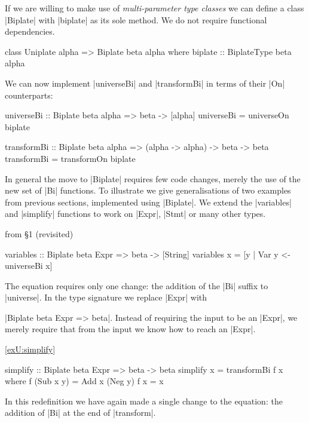 If we are willing to make use of \textit{multi-parameter type classes} \cite{jones:mptc} we can define a class |Biplate| with |biplate| as its sole method. We do not require functional dependencies.

\begin{code}
class  Uniplate alpha => Biplate beta alpha where
       biplate :: BiplateType beta alpha
\end{code}

We can now implement |universeBi| and |transformBi| in terms of their |On| counterparts:

\begin{code}
universeBi :: Biplate beta alpha => beta -> [alpha]
universeBi = universeOn biplate

transformBi :: Biplate beta alpha => (alpha -> alpha) -> beta -> beta
transformBi = transformOn biplate
\end{code}

In general the move to |Biplate| requires few code changes, merely the use of the new set of |Bi| functions. To illustrate we give generalisations of two examples from previous sections, implemented using |Biplate|. We extend the |variables| and |simplify| functions to work on |Expr|, |Stmt| or many other types.

\begin{exampleany}{from \S1 (revisited)}
\begin{code}
variables :: Biplate beta Expr => beta -> [String]
variables x = [y | Var y <- universeBi x]
\end{code}

The equation requires only one change: the addition of the |Bi| suffix to |universe|. In the type signature we replace |Expr| with \ignore|Biplate beta Expr => beta|. Instead of requiring the input to be an |Expr|, we merely require that from the input we know how to reach an |Expr|.
\end{exampleany}

\begin{examplerevisit}{\ref{exU:simplify}}
\begin{code}
simplify :: Biplate beta Expr => beta -> beta
simplify x = transformBi f x
    where  f (Sub x y)  = Add x (Neg y)
           f x          = x
\end{code}

In this redefinition we have again made a single change to the equation: the addition of |Bi| at the end of |transform|.
\end{examplerevisit}

